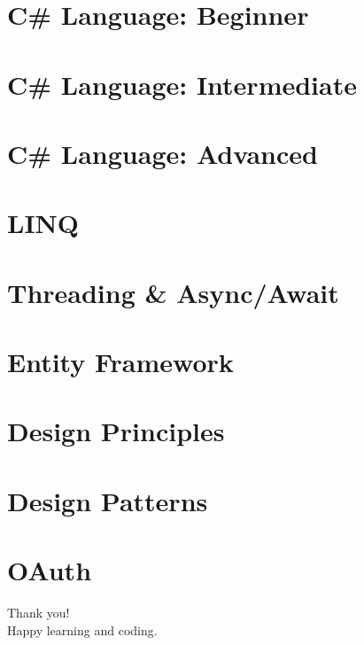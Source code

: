 \documentclass{mybeamer}
\begin{document}
\hypertarget{sec1}{}
\section{C\# Language: Beginner}


\hypertarget{sec2}{}
\section{C\# Language: Intermediate}


\hypertarget{sec3}{}
\section{C\# Language: Advanced}


\hypertarget{sec4}{}
\section{LINQ}


\hypertarget{sec5}{}
\section{Threading \& Async/Await}


\hypertarget{sec6}{}
\section{Entity Framework}


\hypertarget{sec7}{}
\section{Design Principles}


\hypertarget{sec8}{}
\section{Design Patterns}


\hypertarget{sec9}{}
\section{OAuth}


\begin{frame}
  \centering
  {\Huge Thank you!}\\[0.5em]
  Happy learning and coding.
\end{frame}
\end{document}
